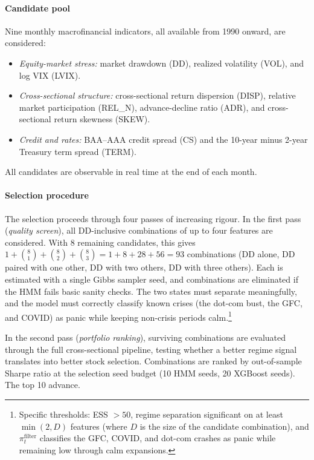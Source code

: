 \paragraph{Candidate pool}
Nine monthly macrofinancial indicators, all available from 1990 onward, are considered:
\begin{itemize}
    \item \emph{Equity-market stress:} market drawdown (DD), realized volatility (VOL), and log VIX (LVIX).
    \item \emph{Cross-sectional structure:} cross-sectional return dispersion (DISP), relative market participation (REL\_N), advance-decline ratio (ADR), and cross-sectional return skewness (SKEW).
    \item \emph{Credit and rates:} BAA--AAA credit spread (CS) and the 10-year minus 2-year Treasury term spread (TERM).
\end{itemize}
All candidates are observable in real time at the end of each month.

\paragraph{Selection procedure}
The selection proceeds through four passes of increasing rigour. In the first pass (\emph{quality screen}), all DD-inclusive combinations of up to four features are considered. With 8 remaining candidates, this gives $1 + \binom{8}{1} + \binom{8}{2} + \binom{8}{3} = 1 + 8 + 28 + 56 = 93$ combinations (DD alone, DD paired with one other, DD with two others, DD with three others). Each is estimated with a single Gibbs sampler seed, and combinations are eliminated if the HMM fails basic sanity checks. The two states must separate meaningfully, and the model must correctly classify known crises (the dot-com bust, the GFC, and COVID) as panic while keeping non-crisis periods calm.\footnote{Specific thresholds: ESS $> 50$, regime separation significant on at least $\min(2, D)$ features (where $D$ is the size of the candidate combination), and $\pi_t^{\text{filter}}$ classifies the GFC, COVID, and dot-com crashes as panic while remaining low through calm expansions.}

In the second pass (\emph{portfolio ranking}), surviving combinations are evaluated through the full cross-sectional pipeline, testing whether a better regime signal translates into better stock selection. Combinations are ranked by out-of-sample Sharpe ratio at the selection seed budget (10 HMM seeds, 20 XGBoost seeds). The top 10 advance.


